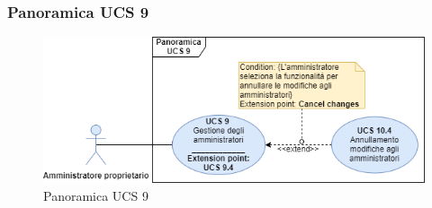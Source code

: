 \newpage
\subsubsection{Panoramica UCS 9}%
\begin{figure}[h]
  \centering
    \includegraphics[scale=0.5]{Sezioni/UseCase/Immagini/PanoramicaUCS9.png}
  \caption{Panoramica UCS 9}
\end{figure}

